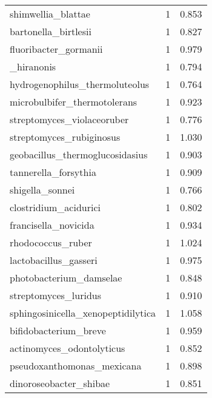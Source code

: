 \begin{tabular}{lrr}
                          shimwellia\_blattae &                   1 &     0.853 \\
                        bartonella\_birtlesii &                   1 &     0.827 \\
                       fluoribacter\_gormanii &                   1 &     0.979 \\
                     [clostridium]\_hiranonis &                   1 &     0.794 \\
              hydrogenophilus\_thermoluteolus &                   1 &     0.764 \\
                microbulbifer\_thermotolerans &                   1 &     0.923 \\
                  streptomyces\_violaceoruber &                   1 &     0.776 \\
                    streptomyces\_rubiginosus &                   1 &     1.030 \\
             geobacillus\_thermoglucosidasius &                   1 &     0.903 \\
                        tannerella\_forsythia &                   1 &     0.909 \\
                             shigella\_sonnei &                   1 &     0.766 \\
                       clostridium\_acidurici &                   1 &     0.802 \\
                        francisella\_novicida &                   1 &     0.934 \\
                           rhodococcus\_ruber &                   1 &     1.024 \\
                       lactobacillus\_gasseri &                   1 &     0.975 \\
                     photobacterium\_damselae &                   1 &     0.848 \\
                        streptomyces\_luridus &                   1 &     0.910 \\
          sphingosinicella\_xenopeptidilytica &                   1 &     1.058 \\
                       bifidobacterium\_breve &                   1 &     0.959 \\
                   actinomyces\_odontolyticus &                   1 &     0.852 \\
                  pseudoxanthomonas\_mexicana &                   1 &     0.898 \\
                      dinoroseobacter\_shibae &                   1 &     0.851 \\

\end{tabular}
